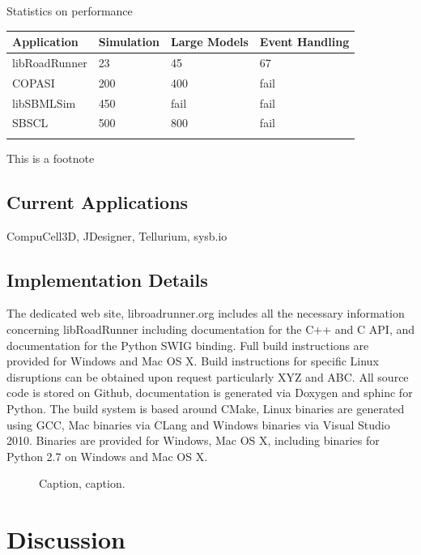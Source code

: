 \documentclass{bioinfo}
\begin{document}
\begin{methods}
Statistics on performance

\begin{table}[!t]
{\begin{tabular}{llll}\toprule
Application & Simulation & Large Models & Event Handling\\\midrule
libRoadRunner & 23 & 45 & 67  \\
COPASI & 200 & 400 & fail\\
libSBMLSim & 450 & fail & fail\\
SBSCL & 500 & 800 & fail \\ \botrule
\end{tabular}}{This is a footnote}
\end{table}

\subsection{Current Applications}

CompuCell3D, JDesigner, Tellurium, sysb.io

\subsection*{Implementation Details}

The dedicated web site, libroadrunner.org includes all the necessary information concerning libRoadRunner including documentation for the C++ and C API, and documentation for the Python SWIG binding. Full build instructions are provided for Windows and Mac OS X. Build instructions for specific Linux disruptions can be obtained upon request particularly XYZ and ABC. All source code is stored on Github, documentation is generated via Doxygen and sphinc for Python. The build system is based around CMake, Linux binaries are generated using GCC, Mac binaries via CLang \citealp{Boffelli03} and Windows binaries via Visual Studio 2010. Binaries are provided for Windows, Mac OS X, including binaries for Python 2.7 on Windows and Mac OS X.

\end{methods}

\begin{figure}[!tpb]%
\caption{Caption, caption.}\label{fig:01}
\end{figure}

\section{Discussion}
\end{document}
